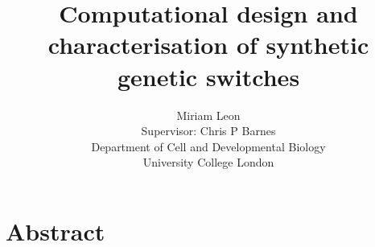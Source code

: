\documentclass[]{phdthesis}
\begin{document}
\title{Computational design and\\characterisation of synthetic\\ genetic switches}
\author{Miriam Leon \\ Supervisor: Chris P Barnes\\ Department of Cell and Developmental
 Biology \\ University College London}
\date{}
\maketitle



\newpage
\section{Abstract}
\end{document}
